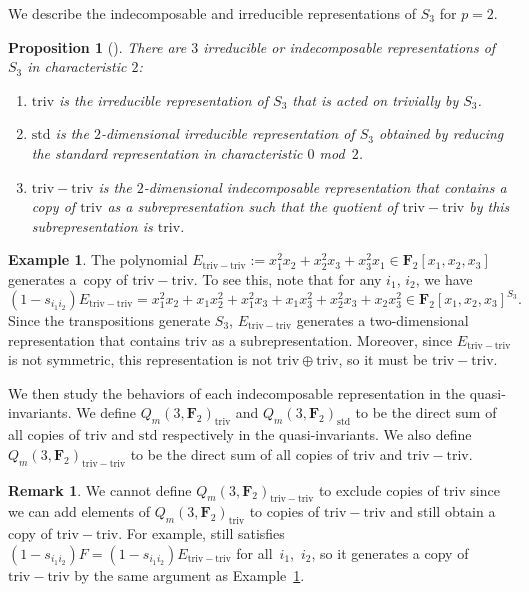 \documentclass[11pt]{article}
\numberwithin{equation}{section}
\newtheorem{Proposition}[Theorem]{Proposition}
\theoremstyle{definition}
\newtheorem{Example}[Theorem]{Example}
\newtheorem{Remark}[Theorem]{Remark}
\numberwithin{equation}{section}
\newcommand{\triv}{\mathrm{triv}}
\newcommand{\std}{\mathrm{std}}
\newcommand{\trtr}{\mathrm{triv-triv}}
\begin{document}
We describe the indecomposable and irreducible representations of $S_3$ for $p=2$.

\begin{Proposition}[\cite{Alperin_1986}]\label{prop:p2indecomp}
 There are $3$ irreducible or indecomposable representations of $S_{3}$ in characteristic $2$:
 \begin{enumerate}\itemsep=0pt
 \item[$1$.] $\triv$ is the irreducible representation of $S_3$ that is acted on trivially by $S_{3}$.
 \item[$2$.] $\std$ is the $2$-dimensional irreducible representation of $S_3$ obtained by reducing the standard representation in characteristic $0$ mod~$2$.
 \item[$3$.] $\trtr$ is the $2$-dimensional indecomposable representation that contains a copy of $\triv$ as a subrepresentation such that the quotient of $\trtr$ by this subrepresentation is $\triv$.
 \end{enumerate}
\end{Proposition}

\begin{Example}\label{eg:p2reps}
 The polynomial $E_{\trtr}:=x_1^2x_2+x_2^2x_3+x_3^2x_1\in\mathbf{F}_2[x_1,x_2,x_3]$ generates a~copy of $\trtr$. To see this, note that for any $i_1$, $i_2$, we have
 \[(1-s_{i_1i_2})E_\trtr=x_1^2x_2+x_1x_2^2+x_1^2x_3+x_1x_3^2+x_2^2x_3+x_2x_3^2\in\mathbf{F}_2[x_1,x_2,x_3]^{S_3}.\]
 Since the transpositions generate $S_3$, $E_\trtr$ generates a two-dimensional representation that contains $\triv$ as a subrepresentation. Moreover, since $E_\trtr$ is not symmetric, this representation is not $\triv\oplus\triv$, so it must be $\trtr$.
\end{Example}

We then study the behaviors of each indecomposable representation in the quasi-invariants. We define $Q_m(3,\mathbf{F}_2)_{\triv}$ and $Q_m(3,\mathbf{F}_2)_{\std}$ to be the direct sum of all copies of $\triv$ and $\std$ respectively in the quasi-invariants. We also define $Q_m(3,\mathbf{F}_2)_\trtr$ to be the direct sum of all copies of $\triv$ and $\trtr$.

\begin{Remark}
 We cannot define $Q_m(3,\mathbf{F}_2)_\trtr$ to exclude copies of $\triv$ since we can add elements of $Q_m(3,\mathbf{F}_2)_\triv$ to copies of $\trtr$ and still obtain a copy of $\trtr$. For example, \smash{$F:=E_\trtr+x_1^3+x_2^3+x_3^3$} still satisfies $(1-s_{i_1i_2})F=(1-s_{i_1i_2})E_\trtr$ for all~$i_1$,~$i_2$, so it generates a copy of $\trtr$ by the same argument as Example~\ref{eg:p2reps}.
\end{Remark}
\end{document}
